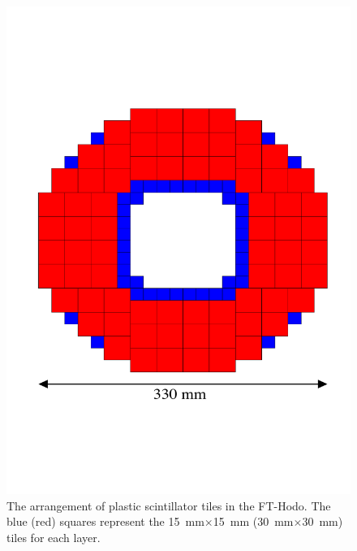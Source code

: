 \begin{figure}[th!]
\centering 
\includegraphics[width=0.85\columnwidth]{./fig/FTHodoLayout.pdf} 
\caption{The arrangement of plastic scintillator tiles in the FT-Hodo. The blue (red) squares represent the
  15~mm$\times$15~mm (30~mm$\times$30~mm) tiles for each layer.} 
\label{Fig:FTHodoLayout} 
\end{figure}


